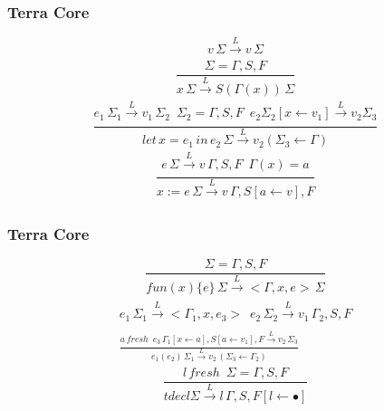 \documentclass{beamer}
\begin{document}
\begin{frame}
  \frametitle{Terra Core}
  \begin{equation}
    v\, \Sigma \xrightarrow[]{L} v\, \Sigma \tag{LVAL}
  \end{equation}
  \newline
  \begin{equation}
    \frac{\Sigma = \Gamma, S, F}{x\, \Sigma \xrightarrow[]{L} S(\Gamma{(x)})\, \Sigma}\tag{LVAR}
  \end{equation}
  \newline
  \begin{equation}
    \frac{e_1 \, \Sigma_1 \xrightarrow[]{L} v_1 \, \Sigma_2 \enspace \Sigma_2 = \Gamma, S, F \enspace e_2 \Sigma_2[x \leftarrow v_1] \xrightarrow[]{L} v_2 \Sigma_3}{let \, x = e_1 \, in \, e_2 \, \Sigma \xrightarrow[]{L} v_2(\Sigma_3 \leftarrow \Gamma)} \tag{LLET}
  \end{equation}
  \newline
  \begin{equation}
    \frac{e \, \Sigma \xrightarrow[]{L} v\, \Gamma, S, F \enspace \Gamma{(x)} = a}{x := e \, \Sigma \xrightarrow[]{L} v \, \Gamma, S[a \leftarrow v], F} \tag{LASN}
  \end{equation}
\end{frame}

\begin{frame}
  \frametitle{Terra Core}
	\begin{equation}
    \frac{\Sigma = \Gamma, S, F}{fun(x)\{e\} \, \Sigma \xrightarrow[]{L} <\Gamma, x, e> \, \Sigma} \tag{LFUN}
  \end{equation}
  \newline
  \begin{equation}
    \begin{split}
      e_1 \, \Sigma_1 \xrightarrow[]{L} <\Gamma_1, x, e_3> \enspace e_2 \, \Sigma_2 \xrightarrow[]{L} v_1 \, \Gamma_2, S, F \\
      \frac{a \, fresh \enspace e_3 \, \Gamma_1[x \leftarrow a], S[a \leftarrow v_1], F \xrightarrow[]{L} v_2 \, \Sigma_3}{e_1(e_2) \, \Sigma_1 \xrightarrow[]{L} v_2 \, (\Sigma_3 \leftarrow \Gamma_2)}
    \end{split} \tag{LAPP}
  \end{equation}
  \newline
  \begin{equation}
    \frac{l\, fresh \enspace \Sigma = \Gamma, S, F}{tdecl \Sigma \xrightarrow[]{L} l \, \Gamma, S, F[l \leftarrow \bullet]} \tag{LTDECL}
  \end{equation}
\end{frame}
\end{document}

